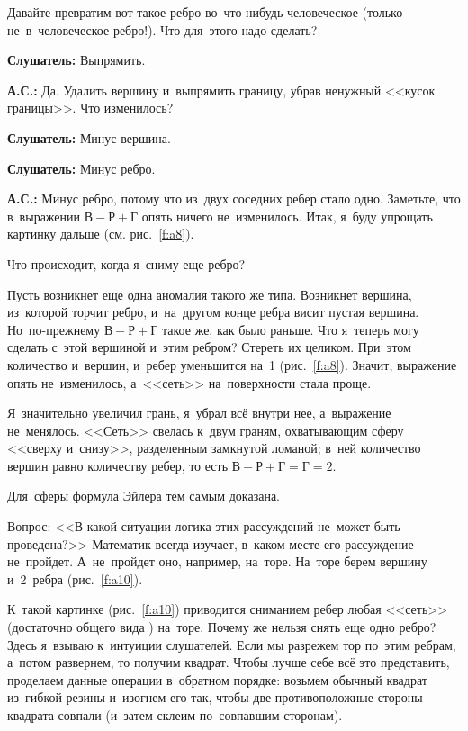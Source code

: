 

Давайте превратим вот такое ребро во~что-нибудь человеческое (только не~в~человеческое ребро!).
Что для~этого надо сделать?

\textbf{Слушатель:} Выпрямить.

\textbf{А.С.:} Да. Удалить вершину и~выпрямить границу, убрав ненужный <<кусок границы>>. Что изменилось?

\textbf{Слушатель:} Минус вершина.

\textbf{Слушатель:} Минус ребро.

\textbf{А.С.:} Минус ребро, потому что из~двух соседних ребер стало одно. Заметьте, что в~выражении
$\text{В}-\text{Р}+\text{Г}$ опять ничего не~изменилось. Итак, я~буду упрощать картинку дальше (см. рис.~\ref{f:a8}).


Что происходит, когда я~сниму еще ребро?

Пусть возникнет еще одна аномалия такого же типа. Возникнет вершина, из~которой торчит ребро,
и~на~другом конце ребра висит пустая вершина. Но~по-прежнему $\text{В}-\text{Р}+\text{Г}$ такое же, как было раньше. Что
я~теперь могу сделать с~этой вершиной и~этим ребром? Стереть их целиком. При~этом количество
и~вершин, и~ребер уменьшится на~1 (рис.~\ref{f:a8}). Значит, выражение опять не~изменилось, а~<<сеть>>
на~поверхности стала проще.


Я~значительно увеличил грань, я~убрал всё внутри нее, а~выражение не~менялось. <<Сеть>> свелась
к~двум граням, охватывающим сферу <<сверху и~снизу>>, разделенным замкнутой ломаной; в~ней
количество вершин равно количеству ребер, то есть $\text{В}-\text{Р}+\text{Г}=\text{Г}=2$.

Для~сферы формула Эйлера тем самым доказана.

Вопрос: <<В какой ситуации логика этих рассуждений не~может быть проведена?>> Математик всегда
изучает, в~каком месте его рассуждение не~пройдет. А~не~пройдет оно, например, на~торе. На~торе
берем вершину и~2~ребра (рис.~\ref{f:a10}).


К~такой картинке (рис.~\ref{f:a10}) приводится сниманием ребер любая <<сеть>> (достаточно общего вида ) на~торе. Почему же
нельзя снять еще одно ребро?
 Здесь я~взываю к~интуиции слушателей. Если мы разрежем тор по~этим
ребрам, а~потом развернем, то получим квадрат. Чтобы лучше себе всё это представить, проделаем
данные операции в~обратном порядке: возьмем обычный квадрат из~гибкой резины и~изогнем его так,
чтобы две противоположные стороны квадрата совпали (и~затем склеим по~совпавшим сторонам).

